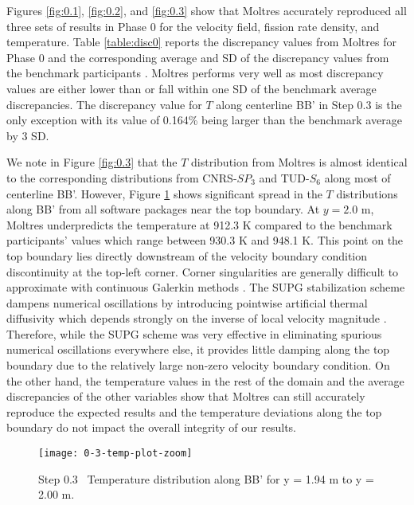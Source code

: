 Figures \ref{fig:0.1}, \ref{fig:0.2}, and \ref{fig:0.3} show that Moltres
accurately reproduced all three sets of results in Phase 0 for the velocity
field, fission rate density, and temperature. Table
\ref{table:disc0} reports the discrepancy values from Moltres for Phase 0 and
the corresponding average and \gls{SD} of the discrepancy values from
the benchmark participants
\cite{tiberga_results_2020}. Moltres performs very well as most discrepancy
values are either lower than or fall within one \gls{SD} of the benchmark
average discrepancies. The discrepancy value for $T$ along centerline BB' in
Step 0.3 is the only exception with its value of 0.164\% being larger than
the benchmark average by 3 \gls{SD}.

We note in Figure \ref{fig:0.3} that the $T$ distribution from Moltres is almost
identical to the corresponding distributions from CNRS-$SP_3$ and TUD-$S_6$
along most of centerline BB'. However, Figure \ref{fig:0.3-zoom} shows
significant spread in the $T$ distributions along BB' from all software
packages near the top boundary. At $y = 2.0$ m, Moltres underpredicts the
temperature at 912.3 K compared to the benchmark participants' values which
range between 930.3 K and 948.1 K. This point on the top boundary lies directly downstream of
the velocity boundary condition discontinuity at the top-left corner.
Corner singularities are generally difficult to approximate with
continuous Galerkin methods \cite{kuhlmann_lid-driven_2018}.
The \gls{SUPG} stabilization scheme dampens numerical oscillations by
introducing pointwise artificial thermal diffusivity which depends strongly on
the inverse of local velocity magnitude \cite{peterson_overview_2018}.
Therefore, while the \gls{SUPG} scheme was very effective in eliminating
spurious numerical oscillations everywhere else, it provides little damping
along the top boundary due to the relatively large non-zero velocity boundary
condition. On the other hand, the temperature values in the rest of the domain
and the average discrepancies of the other variables show that Moltres can
still accurately reproduce the expected results and the temperature deviations
along the top boundary do not impact the overall integrity of our results.

\begin{figure}[htb]
	\centering
	\texttt{[image: 0-3-temp-plot-zoom]}
	\caption{Step 0.3 \textemdash\ Temperature distribution along BB' for y = 1.94 m to
	y = 2.00 m.}
	\label{fig:0.3-zoom}
\end{figure}

